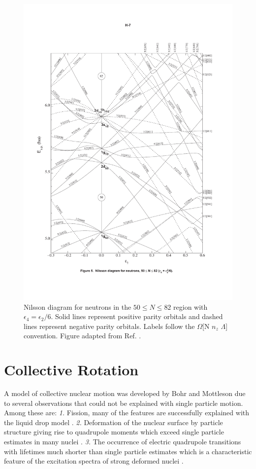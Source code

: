 \begin{figure}[h!]
\centerline{\includegraphics[height=0.8\textheight,clip=true,trim=10 100 10 100]{./img/c2/nilsson_neutron_diagram.pdf}}
	\caption{Nilsson diagram for neutrons in the $50\leq N \leq 82$ region with $\epsilon_4=\epsilon_2/6$. Solid lines represent positive parity orbitals and dashed lines represent negative parity orbitals. Labels follow the $\Omega$[N $n_z$ $\Lambda$] convention. Figure adapted from Ref. \cite{nilssonDiagrams}.\label{fig:chp2-nillson-neutrons}}
\end{figure}

\section{Collective Rotation}
\label{sec:models-rigid-rotor}
A model of collective nuclear motion was developed by Bohr and Mottleson \cite{bohrMottelson2,bohrMottelsonArticle} due to several observations that could not be explained with single particle motion. Among these are: \emph{1.} Fission, many of the features are successfully explained with the liquid drop model \cite{meitnerFissionProducts,fissionMechanism}. \emph{2.} Deformation of the nuclear surface by particle structure \cite{deformationPrediction} giving rise to quadrupole moments which exceed single particle estimates in many nuclei \cite{casimirQuadMoments,nuclearQuadMomentsAndShellStruc}. \emph{3.} The occurrence of electric quadrupole \gr{} transitions with lifetimes much shorter than single particle estimates \cite{nuclearIsomerClassification} which is a characteristic feature of the excitation spectra of strong deformed nuclei \cite{QuadIsomerInterp}.

